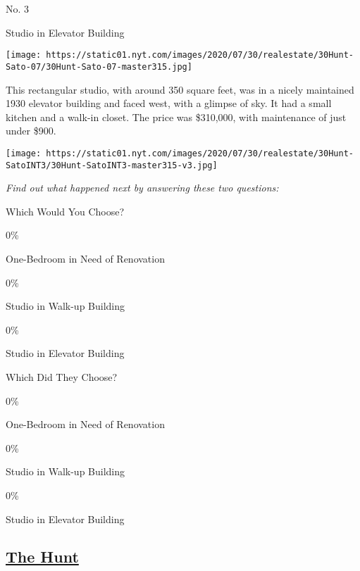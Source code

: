 No. 3

Studio in Elevator Building

\texttt{[image: https://static01.nyt.com/images/2020/07/30/realestate/30Hunt-Sato-07/30Hunt-Sato-07-master315.jpg]}

This rectangular studio, with around 350 square feet, was in a nicely
maintained 1930 elevator building and faced west, with a glimpse of sky.
It had a small kitchen and a walk-in closet. The price was \$310,000,
with maintenance of just under \$900.

\texttt{[image: https://static01.nyt.com/images/2020/07/30/realestate/30Hunt-SatoINT3/30Hunt-SatoINT3-master315-v3.jpg]}

\emph{Find out what happened next by answering these two questions:}

Which Would You Choose?

0\%

One-Bedroom in Need of Renovation

0\%

Studio in Walk-up Building

0\%

Studio in Elevator Building

Which Did They Choose?

0\%

One-Bedroom in Need of Renovation

0\%

Studio in Walk-up Building

0\%

Studio in Elevator Building

\hypertarget{the-hunt}{%
\subsection{\texorpdfstring{\href{https://www.nytimes.com/column/the-hunt}{The
Hunt}}{The Hunt}}\label{the-hunt}}

